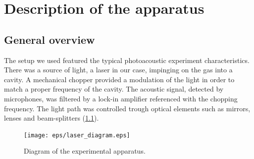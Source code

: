 \chapter{Description of the apparatus}\label{chapter1}
\section{General overview}
The setup we used featured the typical photoacoustic experiment characteristics. There was a source of light, a laser in our case, impinging on the gas into a cavity. A mechanical chopper provided a modulation of the light in order to match a proper frequency of the cavity. The acoustic signal, detected by microphones, was filtered by a lock-in amplifier referenced with the chopping frequency. The light path was controlled trough optical elements such as mirrors, lenses and beam-splitters (\cref{diagram}).
\begin{figure}[!bhpt]\centering
\texttt{[image: eps/laser\_diagram.eps]}
\caption{Diagram of the experimental apparatus.}
\label{diagram}
\end{figure}

